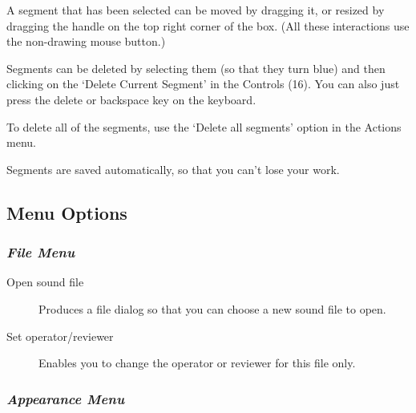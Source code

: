 \documentclass{article}
\begin{document}
A segment that has been selected can be moved by dragging it, or resized by dragging the handle on the top right corner of the box. (All these interactions use the non-drawing mouse button.)

Segments can be deleted by selecting them (so that they turn blue) and then clicking on the `Delete Current Segment' in the Controls (16). You can also just press the delete or backspace key on the keyboard. 

To delete all of the segments, use the `Delete all segments' option in the Actions menu. 

Segments are saved automatically, so that you can't lose your work.


\subsection{Menu Options}	

\subsubsection{{\em File Menu}}

\begin{description}
\item[Open sound file] Produces a file dialog so that you can choose a new sound file to open.
\item[Set operator/reviewer] Enables you to change the operator or reviewer for this file only. 
\end{description}

\subsubsection{{\em Appearance Menu}}
\end{document}
